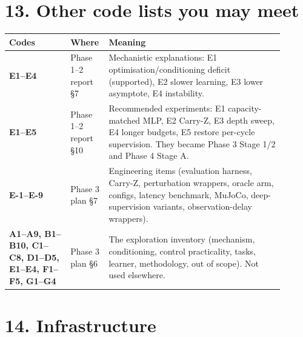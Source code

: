 \documentclass[11pt]{article}
\begin{document}
\section*{13. Other code lists you may meet}



\begin{center}\small\begin{tabular}{>{\raggedright\arraybackslash}p{0.212\linewidth}>{\raggedright\arraybackslash}p{0.088\linewidth}>{\raggedright\arraybackslash}p{0.605\linewidth}}
\toprule
Codes & Where & Meaning \\
\midrule
\textbf{E1--E4} & Phase 1--2 report \S{}7 & Mechanistic explanations: E1 optimisation/conditioning deficit (supported), E2 slower learning, E3 lower asymptote, E4 instability. \\
\textbf{E1--E5} & Phase 1--2 report \S{}10 & Recommended experiments: E1 capacity-matched MLP, E2 Carry-Z, E3 depth sweep, E4 longer budgets, E5 restore per-cycle supervision. They became Phase 3 Stage 1/2 and Phase 4 Stage A. \\
\textbf{E-1--E-9} & Phase 3 plan \S{}7 & Engineering items (evaluation harness, Carry-Z, perturbation wrappers, oracle arm, configs, latency benchmark, MuJoCo, deep-supervision variants, observation-delay wrappers). \\
\textbf{A1--A9, B1--B10, C1--C8, D1--D5, E1--E4, F1--F5, G1--G4} & Phase 3 plan \S{}6 & The exploration inventory (mechanism, conditioning, control practicality, tasks, learner, methodology, out of scope). Not used elsewhere. \\
\bottomrule
\end{tabular}\end{center}



\section*{14. Infrastructure}
\end{document}
